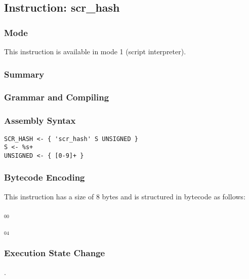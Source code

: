 \subsection{Instruction: scr\_hash}

\subsubsection{Mode}
This instruction is available in mode 1 (script interpreter).
\subsubsection{Summary}


\subsubsection{Grammar and Compiling}


\subsubsection{Assembly Syntax}

\begin{myquote}
\begin{verbatim}
SCR_HASH <- { 'scr_hash' S UNSIGNED }
S <- %s+
UNSIGNED <- { [0-9]+ }
\end{verbatim}
\end{myquote}

\subsubsection{Bytecode Encoding}

This instruction has a size of 8 bytes and is structured in bytecode as follows:

$_{00}$\ 



$_{04}$\ 

\subsubsection{Execution State Change}

.


